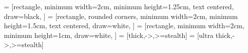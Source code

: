 \usepackage[english]{} %
\usepackage[margin=2cm]{geometry} %
\usepackage{graphicx} %
\usepackage{float} %
\usepackage{amsmath} %
\usepackage{amssymb} %
\usepackage{breqn} %
\usepackage{bm} %
\usepackage{verbatim} %
\usepackage{setspace} %
\usepackage{parskip} %
\usepackage{multicol} %
\usepackage{units} %
\usepackage{booktabs,multirow,multirow} %
\usepackage{enumerate} %
\usepackage{fancyhdr} %
\usepackage{tikz} %
	\usetikzlibrary{shapes.geometric, arrows}
	 = [rectangle, 
					  minimum width=2cm, 
					  minimum height=1.25cm,
					  text centered, 
					  draw=black, 
					 ]
	 = [rectangle, 
					      rounded corners,
					      minimum width=2cm, 
					      minimum height=1.5cm,
					      text centered, 
					      draw=white, 
					     ]
	 = [rectangle,
					      minimum width=2cm,
					      minimum height=1cm,
					      draw=white,
					      ]
	 = [thick,->,>=stealth]
	 = [ultra thick,->,>=stealth]
	
\graphicspath{ {fig/} }

\newcommand{\tab}{\-\hspace{1.5cm}}
\newcommand{\lap}{\nabla^2}
\newcommand{\p}{\partial}

\pagestyle{EveryPage}
